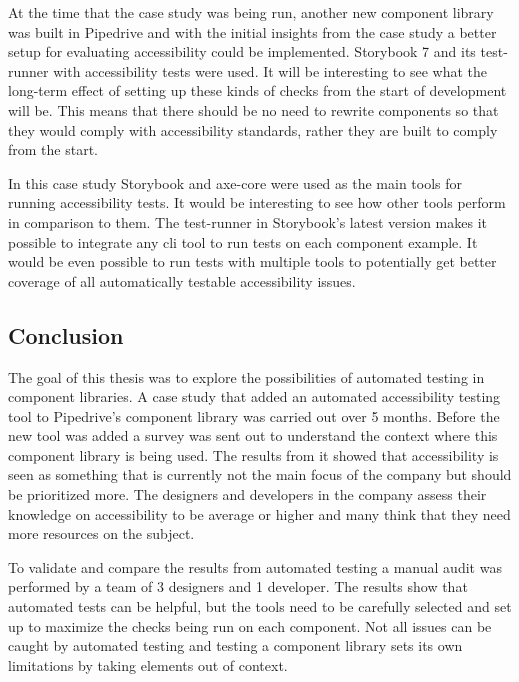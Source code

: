 \documentclass{master_thesis}
\begin{document}
At the time that the case study was being run, another new component library was built in Pipedrive and with the initial insights from the case study a better setup for evaluating accessibility could be implemented. Storybook 7 and its test-runner with accessibility tests were used. It will be interesting to see what the long-term effect of setting up these kinds of checks from the start of development will be. This means that there should be no need to rewrite components so that they would comply with accessibility standards, rather they are built to comply from the start.

In this case study Storybook and axe-core were used as the main tools for running accessibility tests. It would be interesting to see how other tools perform in comparison to them. The test-runner in Storybook's latest version makes it possible to integrate any \ac{cli} tool to run tests on each component example. It would be even possible to run tests with multiple tools to potentially get better coverage of all automatically testable accessibility issues.

\subsection{Conclusion}

The goal of this thesis was to explore the possibilities of automated testing in component libraries. A case study that added an automated accessibility testing tool to Pipedrive's component library was carried out over 5 months.  Before the new tool was added a survey was sent out to understand the context where this component library is being used. The results from it showed that accessibility is seen as something that is currently not the main focus of the company but should be prioritized more. The designers and developers in the company assess their knowledge on accessibility to be average or higher and many think that they need more resources on the subject.

To validate and compare the results from automated testing a manual audit was performed by a team of 3 designers and 1 developer. The results show that automated tests can be helpful, but the tools need to be carefully selected and set up to maximize the checks being run on each component. Not all issues can be caught by automated testing and testing a component library sets its own limitations by taking elements out of context.
\end{document}
